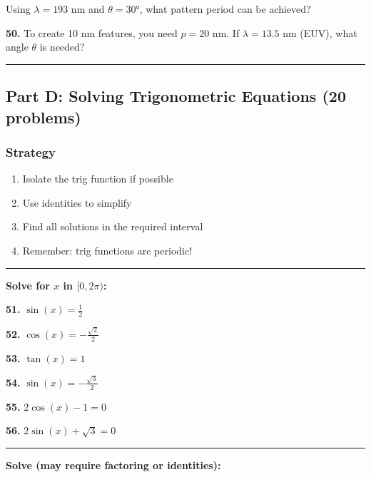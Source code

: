 \documentclass[
  11pt,
]{article}
\providecommand{\tightlist}{%
  \setlength{\itemsep}{0pt}\setlength{\parskip}{0pt}}
\begin{document}
Using \(\lambda = 193\) nm and \(\theta = 30°\), what pattern period can
be achieved?

\textbf{50.} To create 10 nm features, you need \(p = 20\) nm. If
\(\lambda = 13.5\) nm (EUV), what angle \(\theta\) is needed?

\begin{center}\rule{0.5\linewidth}{0.5pt}\end{center}

\hypertarget{part-d-solving-trigonometric-equations-20-problems}{%
\subsection{Part D: Solving Trigonometric Equations (20
problems)}\label{part-d-solving-trigonometric-equations-20-problems}}

\hypertarget{strategy}{%
\subsubsection{Strategy}\label{strategy}}

\begin{enumerate}
\def\labelenumi{\arabic{enumi}.}
\tightlist
\item
  Isolate the trig function if possible
\item
  Use identities to simplify
\item
  Find all solutions in the required interval
\item
  Remember: trig functions are periodic!
\end{enumerate}

\begin{center}\rule{0.5\linewidth}{0.5pt}\end{center}

\textbf{Solve for \(x\) in \([0, 2\pi)\):}

\textbf{51.} \(\sin(x) = \frac{1}{2}\)

\textbf{52.} \(\cos(x) = -\frac{\sqrt{2}}{2}\)

\textbf{53.} \(\tan(x) = 1\)

\textbf{54.} \(\sin(x) = -\frac{\sqrt{3}}{2}\)

\textbf{55.} \(2\cos(x) - 1 = 0\)

\textbf{56.} \(2\sin(x) + \sqrt{3} = 0\)

\begin{center}\rule{0.5\linewidth}{0.5pt}\end{center}

\textbf{Solve (may require factoring or identities):}
\end{document}
